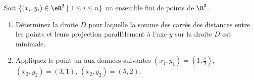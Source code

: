 
\begin{exercice}\label{exoOptimSS0004}

Soit $\{ (x_i,y_i) \in \eR^2 \mid 1 \leq i \leq n \}$ un ensemble fini de 
points de $\R^2$. 
\begin{enumerate}
\item
Déterminez la droite $D$ pour laquelle la somme des carrés des 
distances entre les points et leurs projection parallèlement à l'axe 
$y$ sur la droite $D$ est minimale.
\item
Appliquez le point un aux données suivantes $(x_1,y_1) = (1, \frac12)$, 
$(x_2,y_2) = (3, 1)$, $(x_2,y_2) = (5, 2)$.
\end{enumerate}


\end{exercice}
